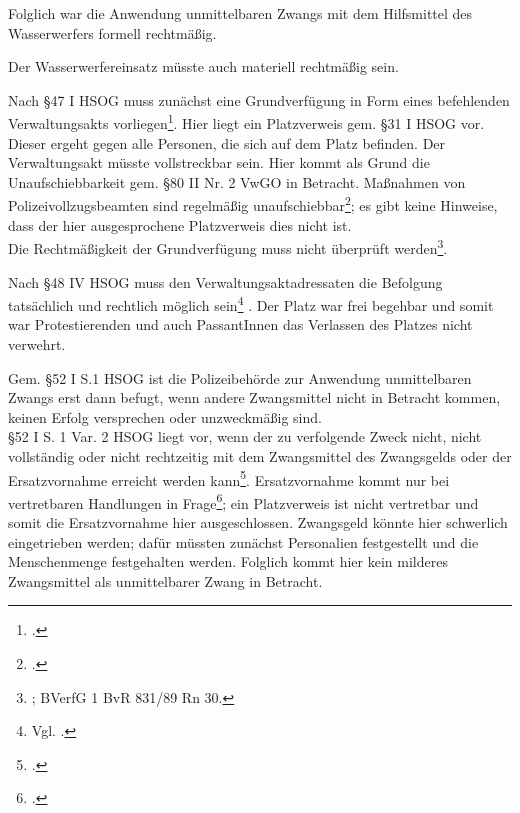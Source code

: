 \documentclass[widefront, ngerman]{jura}
\begin{document}
\levelup {}
Folglich war die Anwendung unmittelbaren Zwangs mit dem Hilfsmittel des Wasserwerfers formell rechtmäßig.

\levelup {}
Der Wasserwerfereinsatz müsste auch materiell rechtmäßig sein.

Nach §47 I HSOG muss zunächst eine Grundverfügung in Form eines befehlenden Verwaltungsakts vorliegen\footcite[Rachor][F Rn 746]{HandbuchPolizeirecht}. Hier liegt ein Platzverweis gem. §31 I HSOG vor. Dieser ergeht gegen alle Personen, die sich auf dem Platz befinden.
Der Verwaltungsakt müsste vollstreckbar sein. Hier kommt als Grund die Unaufschiebbarkeit gem. §80 II Nr. 2 VwGO in Betracht. Maßnahmen von Polizeivollzugsbeamten sind regelmäßig unaufschiebbar\footcite[§24 Rn 31]{PierothSchlinkPolizei}; es gibt keine Hinweise, dass der hier ausgesprochene Platzverweis dies nicht ist.\\
Die Rechtmäßigkeit der Grundverfügung muss nicht überprüft werden\footnote{\cite[§24 Rn 32f.]{PierothSchlinkPolizei}; BVerfG 1 BvR 831/89 Rn 30.}.

Nach §48 IV HSOG muss den Verwaltungsaktadressaten die Befolgung tatsächlich und rechtlich möglich sein\footnote{Vgl. \cite[§24 Rn 34]{PierothSchlinkPolizei}.} . Der Platz war frei begehbar und somit war Protestierenden und auch PassantInnen das Verlassen des Platzes nicht verwehrt.

Gem. §52 I S.1 HSOG ist die Polizeibehörde zur Anwendung unmittelbaren Zwangs erst dann befugt, wenn andere Zwangsmittel nicht in Betracht kommen, keinen Erfolg versprechen oder unzweckmäßig sind.\\
§52 I S. 1 Var. 2 HSOG liegt vor, wenn der zu verfolgende Zweck nicht, nicht vollständig oder nicht rechtzeitig mit dem Zwangsmittel des Zwangsgelds oder der Ersatzvornahme erreicht werden kann\footcite[§52 Rn 11]{HornmannHSOG}.
Ersatzvornahme kommt nur bei vertretbaren Handlungen in Frage\footcite[§24 Rn 10]{PierothSchlinkPolizei}; ein Platzverweis ist nicht vertretbar und somit die Ersatzvornahme hier ausgeschlossen. Zwangsgeld könnte hier schwerlich eingetrieben werden; dafür müssten zunächst Personalien festgestellt und die Menschenmenge festgehalten werden. Folglich kommt hier kein milderes Zwangsmittel als unmittelbarer Zwang in Betracht.
\end{document}
